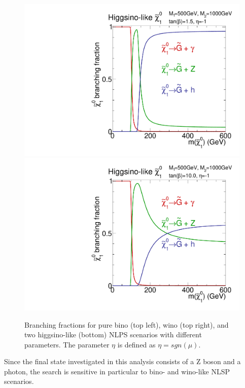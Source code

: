 \begin{figure}[htb]
 \includegraphics[width=\pairwidth]{figures/signal/higgsinoBranching1}
 \includegraphics[width=\pairwidth]{figures/signal/higgsinoBranching2}
 \caption{Branching fractions for pure bino (top left), wino (top right), and two higgsino-like (bottom) NLPS scenarios with different parameters. The parameter $\eta$ is defined as $\eta=sgn(\mu)$.}
 \label{fig:BRNLSP}
\end{figure}
Since the final state investigated in this analysis consists of a Z boson and a photon, the search is sensitive in particular to bino- and wino-like NLSP scenarios.\\
